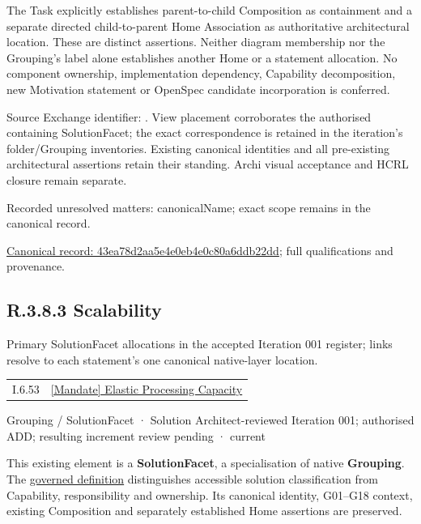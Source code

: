 The Task explicitly establishes parent-to-child Composition as containment and
a separate directed child-to-parent Home Association as authoritative architectural
location. These are distinct assertions. Neither diagram membership nor the
Grouping's label alone establishes another Home or a statement allocation.
No component ownership, implementation dependency, Capability decomposition,
new Motivation statement or OpenSpec candidate incorporation is conferred.



Source Exchange identifier: \texttt{}. View placement corroborates
the authorised containing SolutionFacet; the exact correspondence is retained in the
iteration's folder/Grouping inventories. Existing canonical identities and all
pre-existing architectural assertions retain their standing. Archi visual
acceptance and HCRL closure remain separate.


{\small Recorded unresolved matters: canonicalName; exact scope remains in the canonical record.}\par
{\footnotesize \href{../../../../../../../continuum/grouping/43ea78d2aa5e4e0eb4e0c80a6ddb22dd.md}{Canonical record: 43ea78d2aa5e4e0eb4e0c80a6ddb22dd}; full qualifications and provenance.}\par
\subsection*{R.3.8.3 Scalability}
\label{navigation:R.3.8.3}

Primary SolutionFacet allocations in the accepted Iteration 001 register; links resolve to each statement’s one canonical native-layer location.\par
\begin{longtable}{p{.22\linewidth}p{.73\linewidth}}
I.6.53 & \hyperref[element:ea33d8db942f4b5b9e322d74cbfe975b]{[Mandate] Elastic Processing Capacity} \\
\end{longtable}
\label{element:9cf94c0ac09141a3b909a6a1051bff97}
{\small Grouping / SolutionFacet · Solution Architect-reviewed Iteration 001; authorised ADD; resulting increment review pending · current}\par

This existing element is a \textbf{SolutionFacet}, a specialisation of native
\textbf{Grouping}. The \href{\detokenize{../../../../../../../governance/continuum-representation.md#solutionfacet-classification--1119-candidate}}{governed definition}
distinguishes accessible solution classification from Capability, responsibility
and ownership. Its canonical identity, G01–G18 context, existing Composition
and separately established Home assertions are preserved.



